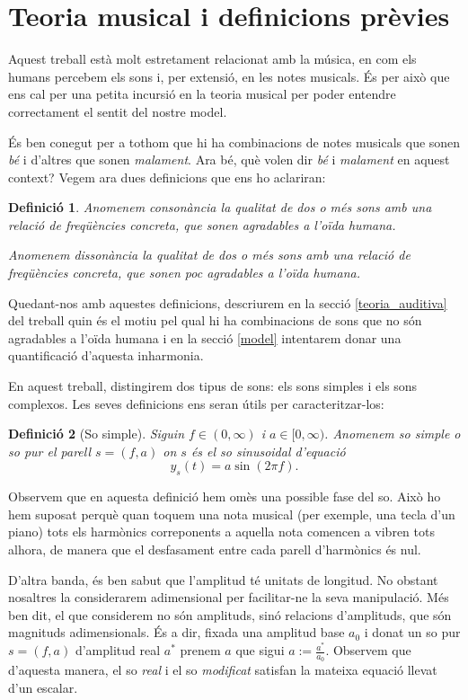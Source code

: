 \documentclass{article}
\theoremstyle{math}
\newtheorem{definition}{Definició}[section]
\theoremstyle{TheoremNum}
\newcommand{\0}{\ensuremath{\vb{0}}}
\begin{document}
\section{Teoria musical i definicions prèvies}\label{teoria_musical}
Aquest treball està molt estretament relacionat amb la música, en com els humans percebem els sons i, per extensió, en les notes musicals. És per això que ens cal per una petita incursió en la teoria musical per poder entendre correctament el sentit del nostre model.\par
És ben conegut per a tothom que hi ha combinacions de notes musicals que sonen \textit{bé} i d'altres que sonen \textit{malament}. Ara bé, què volen dir \textit{bé} i \textit{malament} en aquest context? Vegem ara dues definicions que ens ho aclariran:
\begin{definition}
Anomenem \textit{consonància} la qualitat de dos o més sons amb una relació de freqüències concreta, que sonen agradables a l'oïda humana.\par
\noindent Anomenem \textit{dissonància} la qualitat de dos o més sons amb una relació de freqüències concreta, que sonen poc agradables a l'oïda humana.
\end{definition}
Quedant-nos amb aquestes definicions, descriurem en la secció \ref{teoria_auditiva} del treball quin és el motiu pel qual hi ha combinacions de sons que no són agradables a l'oïda humana i en la secció \ref{model} intentarem donar una quantificació d'aquesta inharmonia.\par
En aquest treball, distingirem dos tipus de sons: els sons simples i els sons complexos. Les seves definicions ens seran útils per caracteritzar-los:
\begin{definition}[So simple]
Siguin $f\in(0,\infty)$ i $a\in[0,\infty)$. Anomenem \textit{so simple} o \textit{so pur} el parell $s=(f, a)$ on $s$ és el so sinusoidal d'equació $$y_s(t)=a\sin(2\pi f).$$
\end{definition}
\noindent Observem que en aquesta definició hem omès una possible fase del so. Això ho hem suposat perquè quan toquem una nota musical (per exemple, una tecla d'un piano) tots els harmònics correponents a aquella nota comencen a vibren tots alhora, de manera que el desfasament entre cada parell d'harmònics és nul.\par D'altra banda, és ben sabut que l'amplitud té unitats de longitud. No obstant nosaltres la considerarem adimensional per facilitar-ne la seva manipulació. Més ben dit, el que considerem no són amplituds, sinó relacions d'amplituds, que són magnituds adimensionals. És a dir, fixada una amplitud base $a_0$ i donat un so pur $s=(f,a)$ d'amplitud real $a^*$ prenem $a$ que sigui $a:=\frac{a^*}{a_0}$. Observem que d'aquesta manera, el so \textit{real} i el so \textit{modificat} satisfan la mateixa equació llevat d'un escalar.
\end{document}
